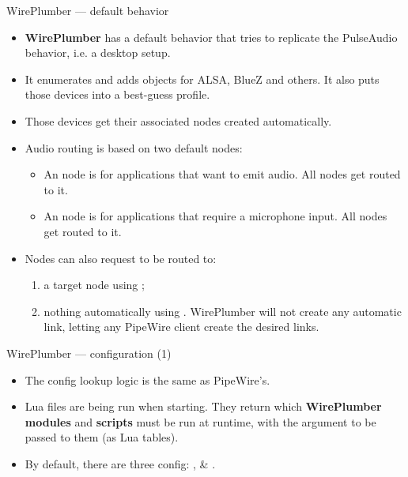\begin{frame}{WirePlumber — default behavior}
  \begin{itemize}

  \item \textbf{WirePlumber} has a default behavior that tries to
    replicate the PulseAudio behavior, i.e. a desktop setup.

  \item It enumerates and adds  objects for ALSA, BlueZ
    and others. It also puts those devices into a best-guess profile.

  \item Those devices get their associated nodes created automatically.

  \item Audio routing is based on two default nodes:

    \begin{itemize}
    \item An  node is for applications that want to
      emit audio. All  nodes get routed to it.
    \item An  node is for applications that require a
      microphone input. All  nodes get routed to it.
    \end{itemize}

  \item Nodes can also request to be routed to:

    \begin{enumerate}
    \item a target node using ;
    \item nothing automatically using .
      WirePlumber will not create any automatic link, letting any
      PipeWire client create the desired links.
    \end{enumerate}

  \end{itemize}
\end{frame}



\begin{frame}{WirePlumber — configuration (1)}
  \begin{itemize}


  \item The config lookup logic is the same as PipeWire's.

  \item Lua files are being run when starting. They return
    which \textbf{WirePlumber modules} and \textbf{scripts} must be run
    at runtime, with the argument to be passed to them (as Lua tables).

  \item By default, there are three config: ,
     \& .

  \end{itemize}
\end{frame}




